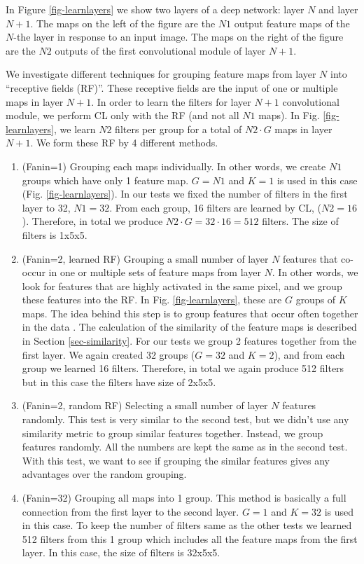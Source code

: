 \documentclass{article} %
\begin{document}
In Figure \ref{fig-learnlayers} we show two layers of a deep network: layer $N$ and layer $N+1$.
The maps on the left of the figure are the $N1$ output feature maps of the $N$-the layer in response to an input image.
The maps on the right of the figure are the $N2$ outputs of the first convolutional module of layer $N+1$. 

We investigate different techniques for grouping feature maps from layer $N$ into ``receptive fields (RF)''.
These receptive fields are the input of one or multiple maps in layer $N+1$. In order to learn the filters for layer $N+1$ convolutional module, we
perform CL only with the RF (and not all $N1$ maps). In Fig. \ref{fig-learnlayers}, we learn $N2$ filters per group for a total of
$N2 \cdot G$ maps in layer $N+1$.
We form these RF by 4 different methods.
\begin{enumerate}
\item (Fanin=1) Grouping each maps individually. In other words, we create $N1$ groups which have only 1 feature map. 
$G = N1$ and $K = 1$ is used in this case (Fig. \ref{fig-learnlayers}). In our tests we fixed the number of filters in the first layer to 32, $N1=32$. 
From each group, 16 filters are learned by CL, ($N2 = 16$).
Therefore, in total we produce $N2 \cdot G = 32 \cdot 16 = 512$ filters. 
The size of filters is 1x5x5. 
\item (Fanin=2, learned RF) Grouping a small number of layer $N$ features that co-occur in one or multiple sets of feature maps from layer $N$. 
In other words, we look for features that are highly activated in the same pixel, and we group these features into the RF.
In Fig. \ref{fig-learnlayers}, these are $G$ groups of $K$ maps.
The idea behind this step is to group features that occur 
often together in the data \cite{masquelier2007learning}.
The calculation of the similarity of the feature maps is described in Section \ref{sec-similarity}.
For our tests we group 2 features together from the first layer.
We again created 32 groups ($G = 32$ and $K = 2$), and from each group we learned 16 filters.
Therefore, in total we again produce 512 filters but in this case the filters have size of 2x5x5. 
\item (Fanin=2, random RF) Selecting a small number of layer $N$ features randomly.
This test is very similar to the second test, but we didn't use any similarity metric to group similar features together.
Instead, we group features randomly. All the numbers are kept the same as in the second test.
With this test, we want to see if grouping the similar features gives any advantages over the random grouping.
\item (Fanin=32) Grouping all maps into 1 group.
This method is basically a full connection from the first layer to the second layer. 
$G = 1$ and $K = 32$ is used in this case.
To keep the number of filters same as the other tests we learned 512 filters from this 1 group which includes all the feature maps from the first layer.
In this case, the size of filters is 32x5x5. 
\end{enumerate}
\end{document}
